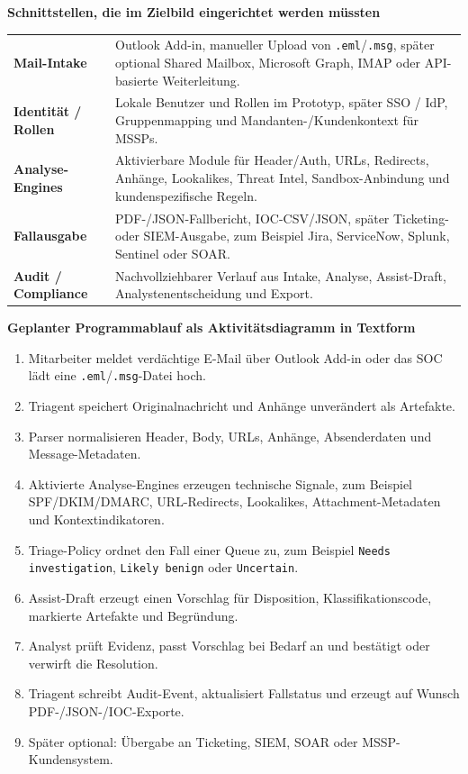 \documentclass[10pt,a4paper]{article}
\begin{document}
\noindent\textbf{Schnittstellen, die im Zielbild eingerichtet werden müssten}\par\vspace{0.12em}
\noindent\begin{tabularx}{\textwidth}{@{}>{\bfseries}p{3.2cm}X@{}}
Mail-Intake & Outlook Add-in, manueller Upload von \texttt{.eml}/\texttt{.msg}, später optional Shared Mailbox, Microsoft Graph, IMAP oder API-basierte Weiterleitung.\\
Identität / Rollen & Lokale Benutzer und Rollen im Prototyp, später SSO / IdP, Gruppenmapping und Mandanten-/Kundenkontext für MSSPs.\\
Analyse-Engines & Aktivierbare Module für Header/Auth, URLs, Redirects, Anhänge, Lookalikes, Threat Intel, Sandbox-Anbindung und kundenspezifische Regeln.\\
Fallausgabe & PDF-/JSON-Fallbericht, IOC-CSV/JSON, später Ticketing- oder SIEM-Ausgabe, zum Beispiel Jira, ServiceNow, Splunk, Sentinel oder SOAR.\\
Audit / Compliance & Nachvollziehbarer Verlauf aus Intake, Analyse, Assist-Draft, Analystenentscheidung und Export.\\
\end{tabularx}

\vspace{0.35em}
\noindent\textbf{Geplanter Programmablauf als Aktivitätsdiagramm in Textform}
\begin{enumerate}
  \item Mitarbeiter meldet verdächtige E-Mail über Outlook Add-in oder das SOC lädt eine \texttt{.eml}/\texttt{.msg}-Datei hoch.
  \item Triagent speichert Originalnachricht und Anhänge unverändert als Artefakte.
  \item Parser normalisieren Header, Body, URLs, Anhänge, Absenderdaten und Message-Metadaten.
  \item Aktivierte Analyse-Engines erzeugen technische Signale, zum Beispiel SPF/DKIM/DMARC, URL-Redirects, Lookalikes, Attachment-Metadaten und Kontextindikatoren.
  \item Triage-Policy ordnet den Fall einer Queue zu, zum Beispiel \texttt{Needs investigation}, \texttt{Likely benign} oder \texttt{Uncertain}.
  \item Assist-Draft erzeugt einen Vorschlag für Disposition, Klassifikationscode, markierte Artefakte und Begründung.
  \item Analyst prüft Evidenz, passt Vorschlag bei Bedarf an und bestätigt oder verwirft die Resolution.
  \item Triagent schreibt Audit-Event, aktualisiert Fallstatus und erzeugt auf Wunsch PDF-/JSON-/IOC-Exporte.
  \item Später optional: Übergabe an Ticketing, SIEM, SOAR oder MSSP-Kundensystem.
\end{enumerate}
\end{document}
